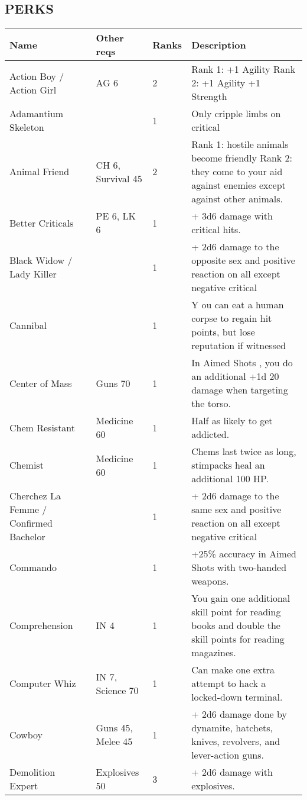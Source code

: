 
\subsection{PERKS}
\begin{longtable}{|p{3.3cm}|p{3.1cm}|p{1.2cm}|p{8.4cm}|}
\hline
\bfseries Name & \bfseries Other reqs & \bfseries Ranks & \bfseries Description \\
\hline
\endhead

Action Boy / Action Girl  & AG 6  & 2  & Rank 1: +1 Agility Rank 2: +1 Agility +1 Strength \\
Adamantium Skeleton  &  & 1  & Only cripple limbs on critical \\
Animal Friend  & CH 6, Survival 45  & 2  & Rank 1:  hostile animals become friendly Rank  2:  they come to your aid against enemies except against other animals.  \\
Better Criticals  & PE 6, LK 6  & 1  & + 3d6  damage with critical hits.  \\
Black Widow / Lady Killer  &  & 1  & + 2d6  damage to the opposite sex and  positive reaction on all except negative critical \\
Cannibal  &  & 1  & Y ou  can  eat a human corpse to regain hit points, but lose  reputation if witnessed   \\
Center of Mass  & Guns 70  & 1  & In  Aimed Shots , you do an additional  +1d 20  damage when targeting the torso.  \\
Chem Resistant  & Medicine 60  & 1  & Half as likely to get addicted.  \\
Chemist  & Medicine 60  & 1  & Chems last twice as long,  stimpacks heal an additional 100 HP.   \\
Cherchez La Femme / Confirmed Bachelor  &  & 1  & + 2d6  damage to the  same  sex and  positive reaction on all except negative critical \\
Commando  &  & 1  & +25\% accuracy in  Aimed Shots  with two-handed weapons.  \\
Comprehension  & IN 4  & 1  & You gain one additional skill point for reading books and double the skill points for reading magazines.  \\
Computer Whiz  & IN 7, Science 70  & 1  & Can make one extra attempt to hack a locked-down terminal.  \\
Cowboy  & Guns 45, Melee 45  & 1  & + 2d6  damage done by dynamite, hatchets, knives, revolvers, and lever-action guns.  \\
Demolition Expert  & Explosives 50  & 3  & + 2d6  damage with explosives.  \\

\end{longtable}
